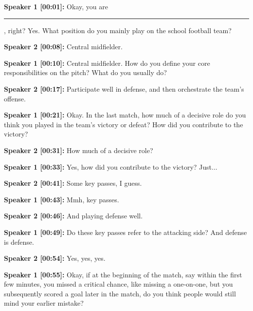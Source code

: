 \documentclass[11pt,a4paper]{article}
\newcommand{\redacted}{\rule{2.5cm}{2ex}}
\begin{document}
\begin{linenumbers}

\noindent \textbf{Speaker 1 [00:01]:} Okay, you are \redacted, right? Yes. What position do you mainly play on the school football team?

\vspace{0.5em}
\noindent \textbf{Speaker 2 [00:08]:} Central midfielder.

\vspace{0.5em}
\noindent \textbf{Speaker 1 [00:10]:} Central midfielder. How do you define your core responsibilities on the pitch? What do you usually do?

\vspace{0.5em}
\noindent \textbf{Speaker 2 [00:17]:} Participate well in defense, and then orchestrate the team's offense.

\vspace{0.5em}
\noindent \textbf{Speaker 1 [00:21]:} Okay. In the last match, how much of a decisive role do you think you played in the team's victory or defeat? How did you contribute to the victory?

\vspace{0.5em}
\noindent \textbf{Speaker 2 [00:31]:} How much of a decisive role?

\vspace{0.5em}
\noindent \textbf{Speaker 1 [00:33]:} Yes, how did you contribute to the victory? Just...

\vspace{0.5em}
\noindent \textbf{Speaker 2 [00:41]:} Some key passes, I guess.

\vspace{0.5em}
\noindent \textbf{Speaker 1 [00:43]:} Mmh, key passes.

\vspace{0.5em}
\noindent \textbf{Speaker 2 [00:46]:} And playing defense well.

\vspace{0.5em}
\noindent \textbf{Speaker 1 [00:49]:} Do these key passes refer to the attacking side? And defense is defense.

\vspace{0.5em}
\noindent \textbf{Speaker 2 [00:54]:} Yes, yes, yes.

\vspace{0.5em}
\noindent \textbf{Speaker 1 [00:55]:} Okay, if at the beginning of the match, say within the first few minutes, you missed a critical chance, like missing a one-on-one, but you subsequently scored a goal later in the match, do you think people would still mind your earlier mistake?


\end{linenumbers}
\end{document}
